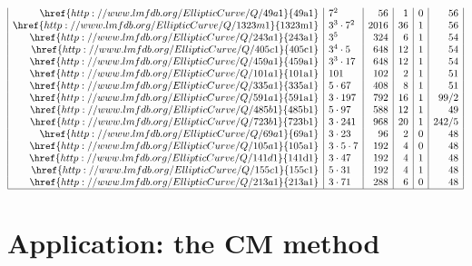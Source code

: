 \documentclass{amsart}
\newcommand{\QQ}{\mathbf{Q}}
\numberwithin{equation}{section}
\theoremstyle{definition}
\begin{document}
\begin{table}[ht]
\[\begin{array}{|r|l|r|r|c|r|}
\href{http://www.lmfdb.org/EllipticCurve/Q/49a1}{\mathrm{49a1}} & 7^{2} & 56 & 1 & 0 & 56 \\
\href{http://www.lmfdb.org/EllipticCurve/Q/1323m1}{\mathrm{1323m1}} & 3^{3} \cdot 7^{2} & 2016 & 36 & 1 & 56 \\
\href{http://www.lmfdb.org/EllipticCurve/Q/243a1}{\mathrm{243a1}} & 3^{5} & 324 & 6 & 1 & 54 \\
\href{http://www.lmfdb.org/EllipticCurve/Q/405c1}{\mathrm{405c1}} & 3^{4} \cdot 5 & 648 & 12 & 1 & 54 \\
\href{http://www.lmfdb.org/EllipticCurve/Q/459a1}{\mathrm{459a1}} & 3^{3} \cdot 17 & 648 & 12 & 1 & 54 \\
\href{http://www.lmfdb.org/EllipticCurve/Q/101a1}{\mathrm{101a1}} & 101 & 102 & 2 & 1 & 51 \\
\href{http://www.lmfdb.org/EllipticCurve/Q/335a1}{\mathrm{335a1}} & 5 \cdot 67 & 408 & 8 & 1 & 51 \\
\href{http://www.lmfdb.org/EllipticCurve/Q/591a1}{\mathrm{591a1}} & 3 \cdot 197 & 792 & 16 & 1 & 99/2 \\
\href{http://www.lmfdb.org/EllipticCurve/Q/485b1}{\mathrm{485b1}} & 5 \cdot 97 & 588 & 12 & 1 & 49 \\
\href{http://www.lmfdb.org/EllipticCurve/Q/723b1}{\mathrm{723b1}} & 3 \cdot 241 & 968 & 20 & 1 & 242/5 \\
\href{http://www.lmfdb.org/EllipticCurve/Q/69a1}{\mathrm{69a1}} & 3 \cdot 23 & 96 & 2 & 0 & 48 \\
\href{http://www.lmfdb.org/EllipticCurve/Q/105a1}{\mathrm{105a1}} & 3 \cdot 5 \cdot 7 & 192 & 4 & 0 & 48 \\
\href{http://www.lmfdb.org/EllipticCurve/Q/141d1}{\mathrm{141d1}} & 3 \cdot 47 & 192 & 4 & 1 & 48 \\
\href{http://www.lmfdb.org/EllipticCurve/Q/155c1}{\mathrm{155c1}} & 5 \cdot 31 & 192 & 4 & 1 & 48 \\
\href{http://www.lmfdb.org/EllipticCurve/Q/213a1}{\mathrm{213a1}} & 3 \cdot 71 & 288 & 6 & 0 & 48 \\
\hline
	\end{array}\]
	\caption{The elliptic curves $E/\QQ$ of conductor $< 500.000$
		such that the modular parametrization
		$\phi : X \rightarrow E$ according to
		the LMFDB~\cite{lmfdb,cremona1992,sage}
		gives $r(C) \geq 66$ or gives $r(C) \geq 48$ and odd~$N$.
	}\label{tab:cremona}
\end{table}


\section{Application: the CM method}\label{sec:apply}
	
\end{document}
